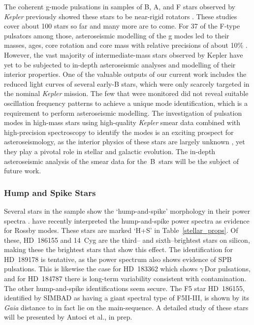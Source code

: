 \documentclass[modern]{aastex62}
\newcommand{\kepler}{\textit{Kepler}\xspace}
\newcommand{\gaia}{\textit{Gaia}\xspace}
\begin{document}
The coherent g-mode pulsations in samples of B, A, and F stars observed by \kepler previously showed these stars to be near-rigid rotators \citep{kurtz2014,saio15,triana15,vanreeth15,vanreeth16,vanreeth18,murphy16,schmid16,moravveji16,ouazzani17,papics17,aerts17,szewczuk18,2018arXiv180907779A,2018A&A...618A..47C,2019MNRAS.482.1757L}. These studies cover about 100 stars so far and many more are to come. For 37 of the F-type pulsators among those, asteroseismic modelling of the g modes led to their masses, ages, core rotation and core mass with relative precisions of about 10\% \citep{2019MNRAS.tmp..495M}. However, the vast majority of intermediate-mass stars observed by Kepler have yet to be subjected to in-depth asteroseismic analyses and modelling of their interior properties. One of the valuable outputs of our current work includes the reduced light curves of several early-B stars, which were only scarcely targeted in the nominal \kepler mission. The few that were monitored did not reveal suitable oscillation frequency patterns to achieve a unique mode identification, which is a requirement to perform asteroseismic modelling. The investigation of pulsation modes in high-mass stars using high-quality \kepler smear data combined with high-precision spectroscopy to identify the modes \citep[Chapter 6]{aertsbook} is an exciting prospect for asteroseismology, as the interior physics of these stars are largely unknown \citep[e.g.][]{2019arXiv190502120B}, yet they play a pivotal role in stellar and galactic evolution. The in-depth asteroseismic analysis of the smear data for the~B~stars will be the subject of future work.

\subsubsection{Hump and Spike Stars}
\label{hs}

Several stars in the sample show the `hump-and-spike' morphology in their power spectra \citep[a broad `hump' of low-amplitude oscillations dominated by one high amplitude coherent oscillation toward the high frequency end of this band;][]{2013MNRAS.431.2240B,2014MNRAS.441.3543B,2017MNRAS.467.1830B}. \citet{2018MNRAS.474.2774S} have recently interpreted the hump-and-spike power spectra as evidence for Rossby modes.
These stars are marked `H+S' in Table~\ref{stellar_props}. Of these, HD~186155 and 14~Cyg are the third-- and sixth--brightest stars on silicon, making these the brightest stars that show this effect. The identification for HD~189178 is tentative, as the power spectrum also shows evidence of SPB pulsations. This is likewise the case for HD~183362 which shows $\gamma$\,Dor pulsations, and for HD~184787 there is long-term variability consistent with contamination. The other hump-and-spike identifications seem secure. The F5 star HD~186155, identified by SIMBAD as having a giant spectral type of F5II-III, is shown by its \gaia distance to in fact lie on the main-sequence. A detailed study of these stars will be presented by Antoci et al., in prep.
\end{document}
